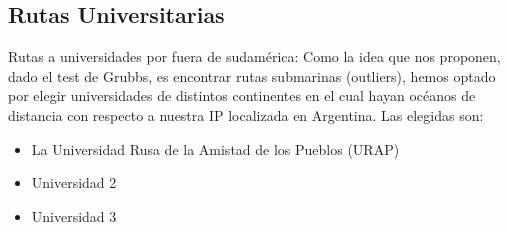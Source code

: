 \subsection{Rutas Universitarias} 

Rutas a universidades por fuera de sudam\'erica: Como la idea que nos proponen, dado el test de Grubbs, es encontrar rutas submarinas (outliers), hemos optado por elegir universidades de distintos continentes en el cual hayan océanos de distancia con respecto a nuestra IP localizada en Argentina. Las elegidas son:

\begin{itemize}
\item La Universidad Rusa de la Amistad de los Pueblos (URAP)
\item Universidad 2
\item Universidad 3
\end{itemize}